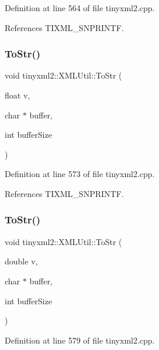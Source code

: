 Definition at line 564 of file tinyxml2.\+cpp.



References T\+I\+X\+M\+L\+\_\+\+S\+N\+P\+R\+I\+N\+TF.

\mbox{\label{classtinyxml2_1_1_x_m_l_util_a8957ad44fee5fa02ba52d73aad4d0a31}} 
\subsubsection{To\+Str()\hspace{0.1cm}{\footnotesize\ttfamily [4/6]}}
{\footnotesize\ttfamily void tinyxml2\+::\+X\+M\+L\+Util\+::\+To\+Str (\begin{DoxyParamCaption}\item[{float}]{v,  }\item[{char $\ast$}]{buffer,  }\item[{int}]{buffer\+Size }\end{DoxyParamCaption})\hspace{0.3cm}{\ttfamily [static]}}



Definition at line 573 of file tinyxml2.\+cpp.



References T\+I\+X\+M\+L\+\_\+\+S\+N\+P\+R\+I\+N\+TF.

\mbox{\label{classtinyxml2_1_1_x_m_l_util_a1cd141e50980fcddd6bf9af5de4b1db7}} 
\subsubsection{To\+Str()\hspace{0.1cm}{\footnotesize\ttfamily [5/6]}}
{\footnotesize\ttfamily void tinyxml2\+::\+X\+M\+L\+Util\+::\+To\+Str (\begin{DoxyParamCaption}\item[{double}]{v,  }\item[{char $\ast$}]{buffer,  }\item[{int}]{buffer\+Size }\end{DoxyParamCaption})\hspace{0.3cm}{\ttfamily [static]}}



Definition at line 579 of file tinyxml2.\+cpp.



